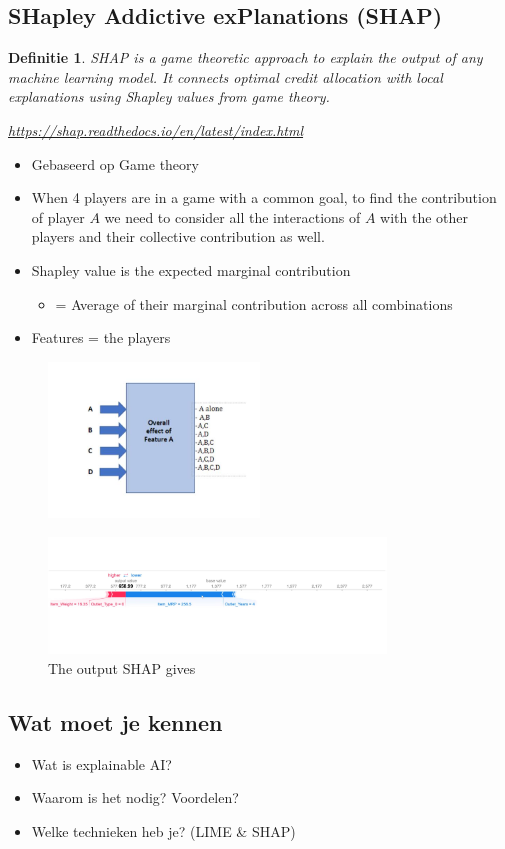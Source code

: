 \documentclass{article}
\newtheorem{theorem}{Definitie}[section]
\begin{document}
\subsection{SHapley Addictive exPlanations (SHAP)}

\begin{theorem}
    SHAP is a game theoretic approach to explain the output of any machine learning model.
    It connects optimal credit allocation with local explanations using Shapley values
    from game theory.

    \url{https://shap.readthedocs.io/en/latest/index.html}
\end{theorem}

\begin{itemize}
    \item Gebaseerd op Game theory
    \item When 4 players are in a game with a common goal, 
    to find the contribution of player $A$ we need to consider all the
    interactions of $A$ with the other players and
    their collective contribution as well.
    \item Shapley value is the expected marginal contribution
    \begin{itemize}
        \item = Average of their marginal contribution across all combinations
    \end{itemize}
    \item Features = the players
\end{itemize}

\begin{figure}[H]
    \centering
    \includegraphics[width=0.5\textwidth]{shap.png}
\end{figure}

\begin{figure}[H]
    \centering
    \includegraphics[width=0.8\textwidth]{shap-output.png}
    \caption{The output SHAP gives}
\end{figure}


\subsection{Wat moet je kennen}

\begin{itemize}
    \item Wat is explainable AI?
    \item Waarom is het nodig? Voordelen?
    \item Welke technieken heb je? (LIME \& SHAP)
\end{itemize}
\end{document}
